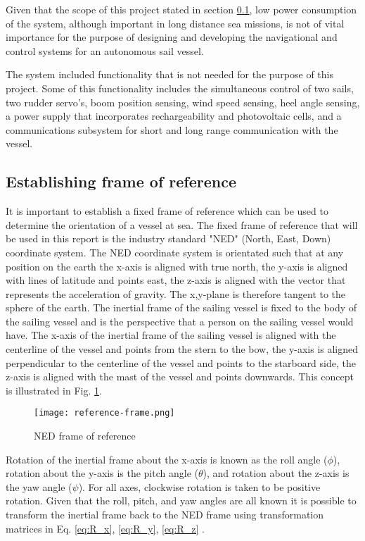 Given that the scope of this project stated in section \ref{}, low power consumption of the system, although important in long distance sea missions, is not of vital importance for 
the purpose of designing and developing the navigational and control systems for an autonomous sail vessel. 

The system included functionality that is not needed for the purpose of this project. Some of this functionality includes the simultaneous 
control of two sails, two rudder servo's, boom position sensing, wind speed sensing, heel angle sensing, a power supply that incorporates rechargeability and photovoltaic cells, and a 
communications subsystem for short and long range communication with the vessel.

\subsection{Establishing frame of reference}

It is important to establish a fixed frame of reference which can be used to determine the orientation of a vessel at sea. The fixed frame of reference that will be used in this report 
is the industry standard "NED" (North, East, Down) coordinate system. The NED coordinate system is orientated such that at any position on the earth the x-axis is aligned with true north, 
the y-axis is aligned with lines of latitude and points east, the z-axis is aligned with the vector that represents the acceleration of gravity. The x,y-plane is therefore tangent to the 
sphere of the earth. The inertial frame of the sailing vessel is fixed to the body of the sailing vessel and is the perspective that a person on the sailing vessel would have. The x-axis of 
the inertial frame of the sailing vessel is aligned with the centerline of the vessel and points from the stern to the bow, the y-axis is aligned perpendicular to the centerline of the vessel
and points to the starboard side, the z-axis is aligned with the mast of the vessel and points downwards. This concept is illustrated in Fig. \ref{fig:reference_frame}. 

\begin{figure}[!h]
    \centering
    \texttt{[image: reference-frame.png]}
    \caption[NED frame of reference]{NED frame of reference}
    \label{fig:reference_frame}
\end{figure}

Rotation of the inertial frame about the x-axis is known as the roll angle ($\phi$), rotation about the y-axis is the pitch angle ($\theta$), and rotation about the z-axis is the yaw angle 
($\psi$). For all axes, clockwise rotation is taken to be positive rotation. Given that the roll, pitch, and yaw angles are all known it is possible to transform the inertial frame back to 
the NED frame using transformation matrices in Eq. \ref{eq:R_x}, \ref{eq:R_y}, \ref{eq:R_z} \cite{e_compass}. 

